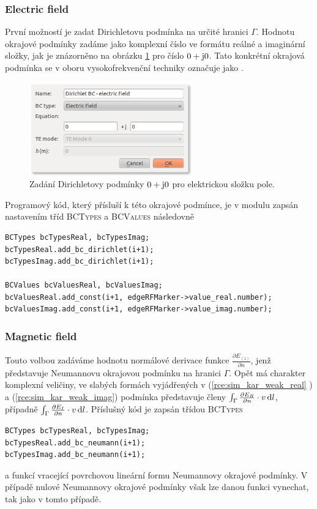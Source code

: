 \subsubsection*{Electric field}
První možností je zadat Dirichletovu podmínka na určité hranici $\Gamma$. Hodnotu okrajové podmínky zadáme jako komplexní číslo ve formátu reálné a imaginární složky, jak je znázorněno na obrázku \ref{obr:sim_BC_electric_field} pro číslo $0 + \mathrm{j} 0$. Tato konkrétní okrajová podmínka se v oboru vysokofrekvenční techniky označuje jako .
\begin{figure}[!h]
	\centering
	\includegraphics[width=7cm]{sim_BC_electric_field.png}
	\caption{Zadání Dirichletovy podmínky $0 + \mathrm{j} 0$ pro elektrickou složku pole.}
	\label{obr:sim_BC_electric_field}
\end{figure}

Programový kód, který přísluší k této okrajové podmínce, je v modulu zapsán nastavením tříd \textsc{BCTypes} a \textsc{BCValues} následovně
\begin{verbatim}
BCTypes bcTypesReal, bcTypesImag;
bcTypesReal.add_bc_dirichlet(i+1);
bcTypesImag.add_bc_dirichlet(i+1);
                
BCValues bcValuesReal, bcValuesImag;
bcValuesReal.add_const(i+1, edgeRFMarker->value_real.number);
bcValuesImag.add_const(i+1, edgeRFMarker->value_imag.number);
\end{verbatim}

\subsubsection*{Magnetic field}
Touto volbou zadáváme hodnotu normálové derivace funkce $\frac{\partial E_{(z)}}{\partial n}$, jenž představuje Neumannovu okrajovou podmínku na hranici $\Gamma$. Opět má charakter komplexní veličiny, ve slabých formách vyjádřených v (\ref{rce:sim_kar_weak_real} ) a (\ref{rce:sim_kar_weak_imag}) podmínka představuje členy $\int_{\Gamma}\frac{\partial E_R}{\partial n}\cdot v\,\mathrm{d} l$, případně $\int_{\Gamma}\frac{\partial E_I}{\partial n}\cdot v\,\mathrm{d} l$. Příslušný kód je zapsán třídou \textsc{BCTypes}
\begin{verbatim}
BCTypes bcTypesReal, bcTypesImag;
bcTypesReal.add_bc_neumann(i+1);
bcTypesImag.add_bc_neumann(i+1);               
\end{verbatim}
a funkcí vracející povrchovou lineární formu Neumannovy okrajové podmínky. V případě nulové Neumannovy okrajové podmínky však lze danou funkci vynechat, tak jako v tomto případě.

